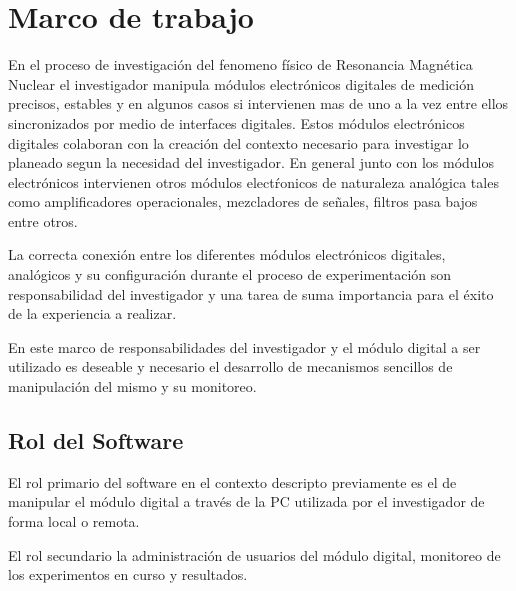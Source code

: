 \section{Marco de trabajo}

En el proceso de investigaci\'on del fenomeno f\'isico de Resonancia Magn\'etica Nuclear el investigador manipula m\'odulos 
electr\'onicos digitales de medici\'on precisos, estables y en algunos casos si intervienen mas de uno a la vez entre ellos sincronizados 
por medio de interfaces digitales. Estos m\'odulos electr\'onicos digitales colaboran con la creaci\'on del contexto necesario para investigar lo planeado 
segun la necesidad del investigador. En general junto con los m\'odulos electr\'onicos intervienen otros m\'odulos elect\'ronicos de naturaleza anal\'ogica
tales como amplificadores operacionales, mezcladores de señales, filtros pasa bajos entre otros.

La correcta conexi\'on entre los diferentes m\'odulos electr\'onicos digitales, anal\'ogicos y su configuraci\'on durante el proceso de experimentaci\'on
son responsabilidad del investigador y una tarea de suma importancia para el \'exito de la experiencia a realizar.

En este marco de responsabilidades del investigador y el m\'odulo digital a ser utilizado es deseable y necesario el desarrollo de mecanismos sencillos de manipulaci\'on
del mismo y su monitoreo.

\subsection{Rol del Software}

El rol primario del software en el contexto descripto previamente es el de manipular el m\'odulo digital a trav\'es de la PC utilizada por el investigador 
de forma local o remota.

El rol secundario la administraci\'on de usuarios del m\'odulo digital, monitoreo de los experimentos en curso y resultados.

\newpage

